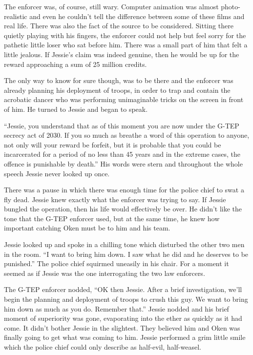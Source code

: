 The enforcer was, of course, still wary.  Computer animation was almost photo-realistic and even he couldn't tell the difference between some of these films and real life.  There was also the fact of the source to be considered.  Sitting there quietly playing with his fingers, the enforcer could not help but feel sorry for the pathetic little loser who sat before him.  There was a small part of him that felt a little jealous.  If Jessie's claim was indeed genuine, then he would be up for the reward approaching a sum of 25 million credits.

The only way to know for sure though, was to be there and the enforcer was already planning his deployment of troops, in order to trap and contain the acrobatic dancer who was performing unimaginable tricks on the screen in front of him.  He turned to Jessie and began to speak.  

``Jessie, you understand that as of this moment you are now under the G-TEP secrecy act of 2030.  If you so much as breathe a word of this operation to anyone, not only will your reward be forfeit, but it is probable that you could be incarcerated for a period of no less than 45 years and in the extreme cases, the offence is punishable by death.''  His words were stern and throughout the whole speech Jessie never looked up once. 

There was a pause in which there was enough time for the police chief to swat a fly dead.  Jessie knew exactly what the enforcer was trying to say.  If Jessie bungled the operation, then his life would effectively be over.  He didn't like the tone that the G-TEP enforcer used, but at the same time, he knew how important catching Oken must be to him and his team.  

Jessie looked up and spoke in a chilling tone which disturbed the other two men in the room.  ``I want to bring him down.  I saw what he did and he deserves to be punished.''  The police chief squirmed uneasily in his chair.  For a moment it seemed as if Jessie was the one interrogating the two law enforcers.  

The G-TEP enforcer nodded, ``OK then Jessie.  After a brief investigation, we'll begin the planning and deployment of troops to crush this guy.  We want to bring him down as much as you do.  Remember that.''   Jessie nodded and his brief moment of superiority was gone, evaporating into the ether as quickly as it had come.  It didn't bother Jessie in the slightest.  They believed him and Oken was finally going to get what was coming to him.  Jessie performed a grim little smile which the police chief could only describe as half-evil, half-weasel.

